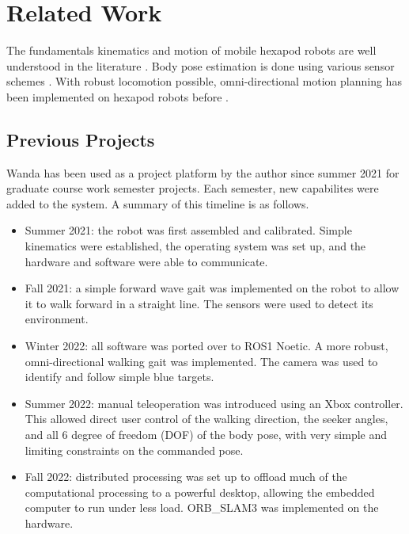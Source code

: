 \section{Related Work}

The fundamentals kinematics and motion of mobile hexapod robots are well understood in the literature \cite{foot_trajectory} \cite{agheli}. Body pose estimation is done using various sensor schemes \cite{poseestimate}. With robust locomotion possible, omni-directional motion planning has been implemented on hexapod robots before \cite{obstacle} \cite{roughterrain}. 

\subsection{ Previous Projects }

Wanda has been used as a project platform by the author since summer 2021 for graduate course work semester projects. Each semester, new capabilites were added to the system. A summary of this timeline is as follows.

\begin{itemize}
    \item Summer 2021: the robot was first assembled and calibrated. Simple kinematics were established, the operating system was set up, and the hardware and software were able to communicate.
    \item Fall 2021: a simple forward wave gait was implemented on the robot to allow it to walk forward in a straight line. The sensors were used to detect its environment. 
    \item Winter 2022: all software was ported over to ROS1 Noetic. A more robust, omni-directional walking gait was implemented. The camera was used to identify and follow simple blue targets.
    \item Summer 2022: manual teleoperation was introduced using an Xbox controller. This allowed direct user control of the walking direction, the seeker angles, and all 6 degree of freedom (DOF) of the body pose, with very simple and limiting constraints on the commanded pose.
    \item Fall 2022: distributed processing was set up to offload much of the computational processing to a powerful desktop, allowing the embedded computer to run under less load. ORB\_SLAM3 \cite{orbslam} was implemented on the hardware.
\end{itemize}

